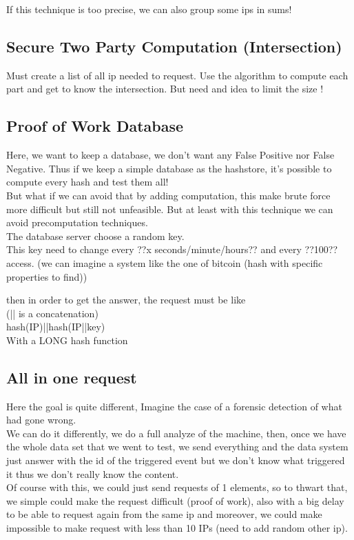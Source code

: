 \documentclass[10pt]{article}
\begin{document}
If this technique is too precise, we can also group some ips in sums!

\subsection{Secure Two Party Computation (Intersection)}
Must create a list of all ip needed to request.
Use the algorithm to compute each part and get to know the intersection.
But need and idea to limit the size ! 

\subsection{Proof of Work Database}
Here, we want to keep a database, we don't want any False Positive nor False Negative. Thus if we keep a simple database as the hashstore, it's possible to compute every hash and test them all!\\
But what if we can avoid that by adding computation, this make brute force more difficult but still not unfeasible. But at least with this technique we can avoid precomputation techniques.\\

The database server choose a random key.\\
This key need to change every ??x seconds/minute/hours?? and every ??100?? access.
(we can imagine a system like the one of bitcoin (hash with specific properties to find))

then in order to get the answer, the request must be like\\
(|| is a concatenation)\\
hash(IP)||hash(IP||key)\\
With a LONG hash function

\subsection{All in one request}
Here the goal is quite different, Imagine the case of a forensic detection of what had gone wrong.\\
We can do it differently, we do a full analyze of the machine, then, once we have the whole data set that we went to test, we send everything and the data system just answer with the id of the triggered event but we don't know what triggered it thus we don't really know the content.\\
Of course with this, we could just send requests of 1 elements, so to thwart that, we simple could make the request difficult (proof of work), also with a big delay to be able to request again from the same ip and moreover, we could make impossible to make request with less than 10 IPs (need to add random other ip).
\end{document}

